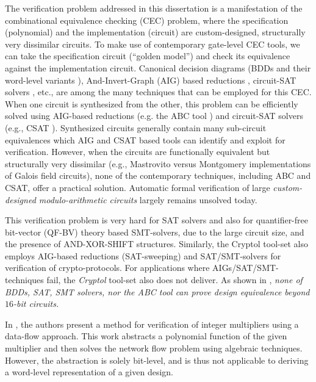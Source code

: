 The verification problem addressed in this dissertation is a
manifestation of the combinational equivalence checking (CEC) problem,
where the specification (polynomial) and  the implementation (circuit)
are custom-designed, structurally very dissimilar circuits. To make
use of contemporary gate-level CEC tools, we can take the 
specification circuit (``golden model'') and check its equivalence
against the implementation circuit. Canonical decision diagrams (BDDs
\cite{BRYA86} and their word-level variants \cite{WLS}),
And-Invert-Graph (AIG) based reductions \cite{AIG:2002}
\cite{alanmi:cec:iccad2006}, circuit-SAT solvers \cite{csat}, etc.,
are among the many techniques that can be employed for this CEC.  
When one circuit is synthesized from the 
other, this problem can be efficiently solved using AIG-based
reductions (e.g. the ABC tool \cite{abc}) and circuit-SAT solvers
(e.g., CSAT \cite{csat}). 
Synthesized circuits generally contain many
sub-circuit equivalences which AIG and CSAT based tools can identify
and exploit for verification. However, when the circuits are
functionally equivalent but structurally very dissimilar (e.g.,
Mastrovito \cite{mastro:1989} versus Montgomery implementations
\cite{acar:1998} of Galois field circuits), none of the 
  contemporary techniques, including ABC and CSAT, offer a practical
  solution. Automatic formal verification of large {\it
    custom-designed modulo-arithmetic circuits} largely remains
  unsolved today.    

This verification problem is very hard for SAT solvers and also for
quantifier-free bit-vector (QF-BV) theory based SMT-solvers, due to
the large circuit size, and the presence of AND-XOR-SHIFT structures. 
Similarly, the Cryptol tool-set \cite{Cryptol:fmcad09} also employs
AIG-based reductions (SAT-sweeping) and SAT/SMT-solvers for
verification of crypto-protocols. For applications where
AIGs/SAT/SMT-techniques fail, the {\it Cryptol} tool-set also does not
deliver. As shown in \cite{lv:phd}, {\it none of BDDs, SAT, SMT
  solvers, nor the  ABC tool can prove design equivalence beyond
  $16$-bit circuits.}

In \cite{ciesielski:flow}, the authors present a method
for verification of integer multipliers using a data-flow
approach. This work abstracts a polynomial function
of the given multiplier and then solves the network flow problem 
using algebraic techniques. However, the abstraction is 
solely bit-level, and is thus not applicable to deriving 
a word-level representation of a given design.

